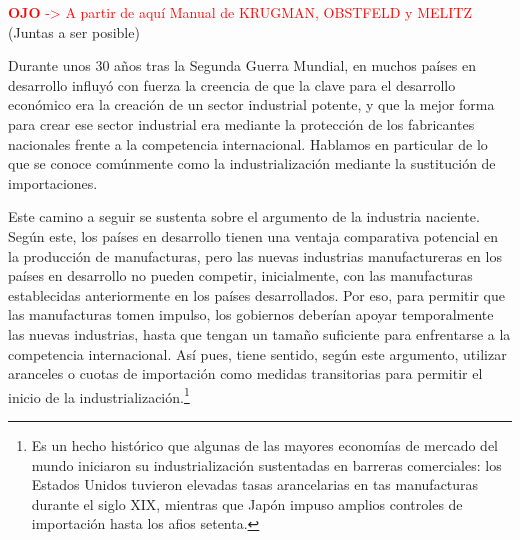 \documentclass[10pt,a4paper]{article}
\begin{document}
\textcolor{red}{\textbf{OJO} -> A partir de aquí Manual de KRUGMAN, OBSTFELD y MELITZ} (Juntas a ser posible)

Durante unos 30 años tras la Segunda Guerra Mundial, en muchos países en desarrollo influyó con fuerza la creencia de que la clave para el desarrollo económico era la creación de un sector industrial potente, y que la mejor forma para crear ese sector industrial era mediante la protección de los fabricantes nacionales frente a la competencia internacional. Hablamos en particular de lo que se conoce comúnmente como la industrialización mediante la sustitución de importaciones.

Este camino a seguir se sustenta sobre el argumento de la industria naciente. Según este, los países en desarrollo tienen una ventaja comparativa potencial en la producción de manufacturas, pero las nuevas industrias manufactureras en los países en desarrollo no pueden competir, inicialmente, con las manufacturas establecidas anteriormente en los países desarrollados. Por eso, para permitir que las manufacturas tomen impulso, los gobiernos deberían apoyar temporalmente las nuevas industrias, hasta que tengan un tamaño suficiente para enfrentarse a la competencia internacional. Así pues, tiene sentido, según este argumento, utilizar aranceles o cuotas de importación como medidas transitorias para permitir el inicio de la industrialización.\footnote{%
    Es un hecho histórico que algunas de las mayores economías de mercado del mundo iniciaron su industrialización sustentadas en barreras comerciales: los Estados Unidos tuvieron elevadas tasas arancelarias en tas manufacturas durante el siglo XIX, mientras que Japón impuso amplios controles de importación hasta los afios setenta.
} 
\end{document}
